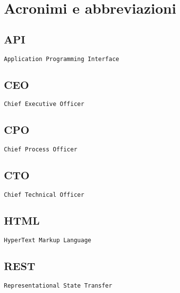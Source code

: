 \chapter{Acronimi e abbreviazioni}

\section*{API}

\texttt{Application Programming Interface}

\section*{CEO}

\texttt{Chief Executive Officer}

\section*{CPO}

\texttt{Chief Process Officer}

\section*{CTO}

\texttt{Chief Technical Officer}


\section*{HTML}

\texttt{HyperText Markup Language}

\section*{REST}

\texttt{Representational State Transfer}
